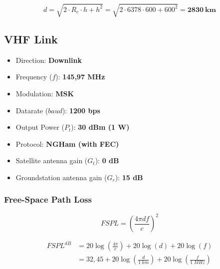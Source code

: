 \begin{equation}
d = \sqrt{2\cdot R_{e}\cdot h + h^{2}} = \sqrt{2\cdot 6378\cdot 600 + 600^{2}} = \mathbf{2830\ km}
\end{equation}





\subsection{VHF Link}

\begin{itemize}
    \item Direction: \textbf{Downlink}
    \item Frequency ($f$): \textbf{145,97 MHz}
    \item Modulation: \textbf{MSK}
    \item Datarate ($baud$): \textbf{1200 bps}
    \item Output Power ($P_{t}$): \textbf{30 dBm (1 W)}
    \item Protocol: \textbf{NGHam (with FEC)}
    \item Satellite antenna gain ($G_{t}$): \textbf{0 dB}
    \item Groundstation antenna gain ($G_{r}$): \textbf{15 dB}
\end{itemize}

\subsubsection{Free-Space Path Loss}

\begin{equation}
FSPL = \left( \frac{4\pi d f}{c} \right)^{2}
\end{equation}

\begin{equation}
    \begin{split}
        FSPL^{dB} & = 20\log\left(\frac{4\pi}{c}\right) + 20\log\left(d\right) + 20\log\left(f\right) \\
                  & = 32,45 + 20\log\left(\frac{d}{1\ km}\right) + 20\log\left(\frac{f}{1\ MHz}\right) \\
    \end{split}
\end{equation}

